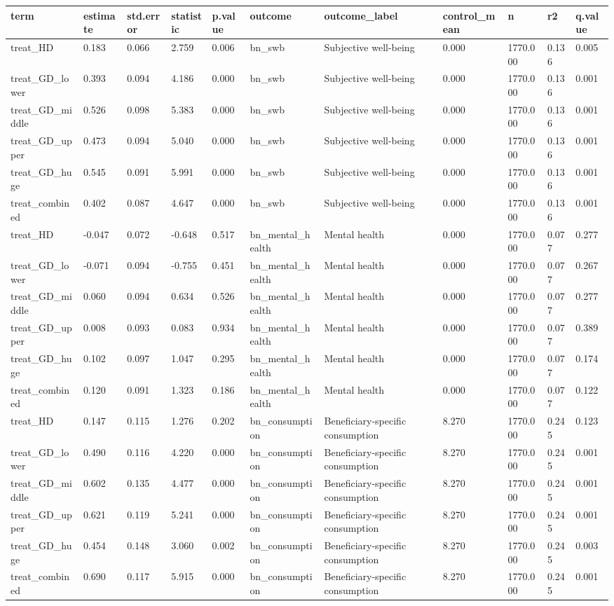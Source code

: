 \begin{tabular}{lllllllllll}
\toprule
term & estimate & std.error & statistic & p.value & outcome & outcome\_label & control\_mean & n & r2 & q.value
 \\
\midrule
treat\_HD & 0.183 & 0.066 & 2.759 & 0.006 & bn\_swb & Subjective well-being & 0.000 & 1770.000 & 0.136 & 0.005 \\
treat\_GD\_lower & 0.393 & 0.094 & 4.186 & 0.000 & bn\_swb & Subjective well-being & 0.000 & 1770.000 & 0.136 & 0.001 \\
treat\_GD\_middle & 0.526 & 0.098 & 5.383 & 0.000 & bn\_swb & Subjective well-being & 0.000 & 1770.000 & 0.136 & 0.001 \\
treat\_GD\_upper & 0.473 & 0.094 & 5.040 & 0.000 & bn\_swb & Subjective well-being & 0.000 & 1770.000 & 0.136 & 0.001 \\
treat\_GD\_huge & 0.545 & 0.091 & 5.991 & 0.000 & bn\_swb & Subjective well-being & 0.000 & 1770.000 & 0.136 & 0.001 \\
treat\_combined & 0.402 & 0.087 & 4.647 & 0.000 & bn\_swb & Subjective well-being & 0.000 & 1770.000 & 0.136 & 0.001 \\
treat\_HD & -0.047 & 0.072 & -0.648 & 0.517 & bn\_mental\_health & Mental health & 0.000 & 1770.000 & 0.077 & 0.277 \\
treat\_GD\_lower & -0.071 & 0.094 & -0.755 & 0.451 & bn\_mental\_health & Mental health & 0.000 & 1770.000 & 0.077 & 0.267 \\
treat\_GD\_middle & 0.060 & 0.094 & 0.634 & 0.526 & bn\_mental\_health & Mental health & 0.000 & 1770.000 & 0.077 & 0.277 \\
treat\_GD\_upper & 0.008 & 0.093 & 0.083 & 0.934 & bn\_mental\_health & Mental health & 0.000 & 1770.000 & 0.077 & 0.389 \\
treat\_GD\_huge & 0.102 & 0.097 & 1.047 & 0.295 & bn\_mental\_health & Mental health & 0.000 & 1770.000 & 0.077 & 0.174 \\
treat\_combined & 0.120 & 0.091 & 1.323 & 0.186 & bn\_mental\_health & Mental health & 0.000 & 1770.000 & 0.077 & 0.122 \\
treat\_HD & 0.147 & 0.115 & 1.276 & 0.202 & bn\_consumption & Beneficiary-specific consumption & 8.270 & 1770.000 & 0.245 & 0.123 \\
treat\_GD\_lower & 0.490 & 0.116 & 4.220 & 0.000 & bn\_consumption & Beneficiary-specific consumption & 8.270 & 1770.000 & 0.245 & 0.001 \\
treat\_GD\_middle & 0.602 & 0.135 & 4.477 & 0.000 & bn\_consumption & Beneficiary-specific consumption & 8.270 & 1770.000 & 0.245 & 0.001 \\
treat\_GD\_upper & 0.621 & 0.119 & 5.241 & 0.000 & bn\_consumption & Beneficiary-specific consumption & 8.270 & 1770.000 & 0.245 & 0.001 \\
treat\_GD\_huge & 0.454 & 0.148 & 3.060 & 0.002 & bn\_consumption & Beneficiary-specific consumption & 8.270 & 1770.000 & 0.245 & 0.003 \\
treat\_combined & 0.690 & 0.117 & 5.915 & 0.000 & bn\_consumption & Beneficiary-specific consumption & 8.270 & 1770.000 & 0.245 & 0.001 \\
\bottomrule
\end{tabular}

